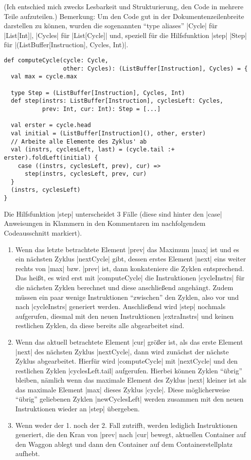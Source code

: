 (Ich entschied mich zwecks Lesbarkeit und Strukturierung, den Code in mehrere Teile aufzuteilen.)
Bemerkung: Um den Code gut in der Dokumentenzeilenbreite darstellen zu können,
wurden die sogenannten ``type aliases'' |Cycle| für |List[Int]|, |Cycles| für |List[Cycle]| und,
speziell für die Hilfsfunktion |step| |Step| für |(ListBuffer[Instruction], Cycles, Int)|.
\begin{lstlisting}
def computeCycle(cycle: Cycle,
                 other: Cycles): (ListBuffer[Instruction], Cycles) = {
  val max = cycle.max

  type Step = (ListBuffer[Instruction], Cycles, Int)
  def step(instrs: ListBuffer[Instruction], cyclesLeft: Cycles,
           prev: Int, cur: Int): Step = [...]

  val erster = cycle.head
  val initial = (ListBuffer[Instruction](), other, erster)
  // Arbeite alle Elemente des Zyklus' ab
  val (instrs, cyclesLeft, last) = (cycle.tail :+ erster).foldLeft(initial) {
    case ((instrs, cyclesLeft, prev), cur) =>
      step(instrs, cyclesLeft, prev, cur)
  }
  (instrs, cyclesLeft)
}
\end{lstlisting}
Die Hilfsfunktion |step| unterscheidet 3 Fälle (diese sind hinter den |case| Anweisungen in Klammern in den Kommentaren im nachfolgendem Codeausschnitt markiert).
\begin{enumerate}
 \item Wenn das letzte betrachtete Element |prev| das Maximum |max| ist und es ein nächsten Zyklus |nextCycle| gibt,
       dessen erstes Element |next| eins weiter rechts von |max| bzw. |prev| ist, dann konkateniere die Zyklen entsprechend.
       Das heißt, es wird erst mit |computeCycle| die Instruktionen |cycleInstrs| für die nächsten Zyklen berechnet
       und diese anschließend angehängt. Zudem müssen ein paar wenige Instruktionen ``zwischen'' den Zyklen,
       also vor und nach |cycleInstrs| generiert werden. Anschließend wird |step| nochmals aufgerufen,
       diesmal mit den neuen Instruktionen |extraInstrs| und keinen restlichen Zyklen, da diese bereits alle abgearbeitet sind.
 \item Wenn das aktuell betrachtete Element |cur| größer ist, als das erste Element |next| des nächsten Zyklus |nextCycle|,
       dann wird zunächst der nächste Zyklus abgearbeitet.
       Hierfür wird |computeCycle| mit |nextCycle| und den restlichen Zyklen |cyclesLeft.tail| aufgerufen.
       Hierbei können Zyklen ``übrig'' bleiben, nämlich wenn das maximale Element des Zyklus |next| kleiner ist als das maximale Element |max| dieses Zyklus |cycle|.
       Diese möglicherweise ``übrig'' geliebenen Zyklen |newCyclesLeft| werden zusammen mit den neuen Instruktionen wieder an |step| übergeben.
 \item Wenn weder der 1. noch der 2. Fall zutrifft, werden lediglich Instruktionen generiert,
       die den Kran von |prev| nach |cur| bewegt, aktuellen Container auf den Waggon ablegt und dann den Container auf dem Containerstellplatz aufhebt.
\end{enumerate}
